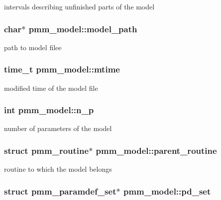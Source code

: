 intervals describing unfinished parts of the model \hypertarget{structpmm__model_aba56fe203b7b1c2a19a7d1c29afae80f}{
\subsubsection[{model\-\_\-path}]{\setlength{\rightskip}{0pt plus 5cm}char$\ast$ pmm\-\_\-model\-::model\-\_\-path}}\label{structpmm__model_aba56fe203b7b1c2a19a7d1c29afae80f}
path to model filee \hypertarget{structpmm__model_a74b64763a97bc359a4e0861010e090d3}{
\subsubsection[{mtime}]{\setlength{\rightskip}{0pt plus 5cm}time\-\_\-t pmm\-\_\-model\-::mtime}}\label{structpmm__model_a74b64763a97bc359a4e0861010e090d3}
modified time of the model file \hypertarget{structpmm__model_aa911d7af855c1a761fbcebd9545dc2c1}{
\subsubsection[{n\-\_\-p}]{\setlength{\rightskip}{0pt plus 5cm}int pmm\-\_\-model\-::n\-\_\-p}}\label{structpmm__model_aa911d7af855c1a761fbcebd9545dc2c1}
number of parameters of the model \hypertarget{structpmm__model_a6a2335135513ba6f9bd43f56f9311431}{
\subsubsection[{parent\-\_\-routine}]{\setlength{\rightskip}{0pt plus 5cm}struct {\bf pmm\-\_\-routine}$\ast$ pmm\-\_\-model\-::parent\-\_\-routine}}\label{structpmm__model_a6a2335135513ba6f9bd43f56f9311431}
routine to which the model belongs \hypertarget{structpmm__model_a30f07ca77b7d593ec85bd1cc6d9ff1bc}{
\subsubsection[{pd\-\_\-set}]{\setlength{\rightskip}{0pt plus 5cm}struct {\bf pmm\-\_\-paramdef\-\_\-set}$\ast$ pmm\-\_\-model\-::pd\-\_\-set}}\label{structpmm__model_a30f07ca77b7d593ec85bd1cc6d9ff1bc}
